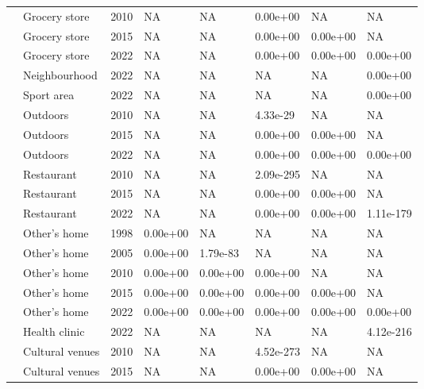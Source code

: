 \documentclass[preprint, 3p,
authoryear]{elsarticle} %
\begin{document}
\begin{table}
{\begin{tabular}[t]{llllllll}
 & Grocery store & 2010 & NA & NA & 0.00e+00 & NA & NA\\

 & Grocery store & 2015 & NA & NA & 0.00e+00 & 0.00e+00 & NA\\

 & Grocery store & 2022 & NA & NA & 0.00e+00 & 0.00e+00 & 0.00e+00\\

 & Neighbourhood & 2022 & NA & NA & NA & NA & 0.00e+00\\

 & Sport area & 2022 & NA & NA & NA & NA & 0.00e+00\\

 & Outdoors & 2010 & NA & NA & 4.33e-29 & NA & NA\\

 & Outdoors & 2015 & NA & NA & 0.00e+00 & 0.00e+00 & NA\\

 & Outdoors & 2022 & NA & NA & 0.00e+00 & 0.00e+00 & 0.00e+00\\

 & Restaurant & 2010 & NA & NA & 2.09e-295 & NA & NA\\

 & Restaurant & 2015 & NA & NA & 0.00e+00 & 0.00e+00 & NA\\

 & Restaurant & 2022 & NA & NA & 0.00e+00 & 0.00e+00 & 1.11e-179\\

 & Other's home & 1998 & 0.00e+00 & NA & NA & NA & NA\\

 & Other's home & 2005 & 0.00e+00 & 1.79e-83 & NA & NA & NA\\

 & Other's home & 2010 & 0.00e+00 & 0.00e+00 & 0.00e+00 & NA & NA\\

 & Other's home & 2015 & 0.00e+00 & 0.00e+00 & 0.00e+00 & 0.00e+00 & NA\\

 & Other's home & 2022 & 0.00e+00 & 0.00e+00 & 0.00e+00 & 0.00e+00 & 0.00e+00\\

 & Health clinic & 2022 & NA & NA & NA & NA & 4.12e-216\\

 & Cultural venues & 2010 & NA & NA & 4.52e-273 & NA & NA\\

 & Cultural venues & 2015 & NA & NA & 0.00e+00 & 0.00e+00 & NA\\


\end{tabular}}
\end{table}
\end{document}
